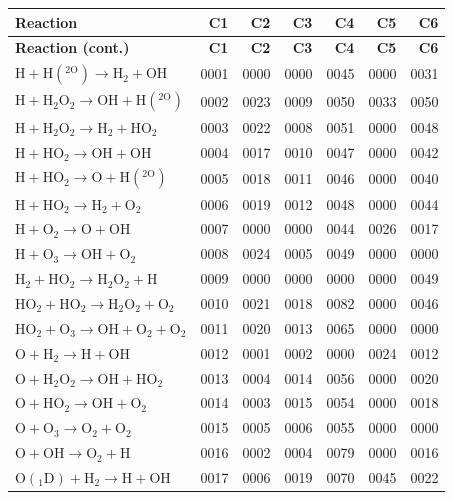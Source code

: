 \begin{longtable}{lrrrrrr}
\hline
\textbf{Reaction} & \textbf{C1} & \textbf{C2} & \textbf{C3} & \textbf{C4} & \textbf{C5} & \textbf{C6} \\
\hline
\endfirsthead
\hline
\textbf{Reaction (cont.)} & \textbf{C1} & \textbf{C2} & \textbf{C3} & \textbf{C4} & \textbf{C5} & \textbf{C6} \\
\hline
\endhead
\hline
\endfoot
$\mathrm{H + H(^{2O}) \rightarrow H_2 + OH}$ & 0001 & 0000 & 0000 & 0045 & 0000 & 0031 \\
$\mathrm{H + H_2O_2 \rightarrow OH + H(^{2O})}$ & 0002 & 0023 & 0009 & 0050 & 0033 & 0050 \\
$\mathrm{H + H_2O_2 \rightarrow H_2 + HO_2}$ & 0003 & 0022 & 0008 & 0051 & 0000 & 0048 \\
$\mathrm{H + HO_2 \rightarrow OH + OH}$ & 0004 & 0017 & 0010 & 0047 & 0000 & 0042 \\
$\mathrm{H + HO_2 \rightarrow O + H(^{2O})}$ & 0005 & 0018 & 0011 & 0046 & 0000 & 0040 \\
$\mathrm{H + HO_2 \rightarrow H_2 + O_2}$ & 0006 & 0019 & 0012 & 0048 & 0000 & 0044 \\
$\mathrm{H + O_2 \rightarrow O + OH}$ & 0007 & 0000 & 0000 & 0044 & 0026 & 0017 \\
$\mathrm{H + O_3 \rightarrow OH + O_2}$ & 0008 & 0024 & 0005 & 0049 & 0000 & 0000 \\
$\mathrm{H_2 + HO_2 \rightarrow H_2O_2 + H}$ & 0009 & 0000 & 0000 & 0000 & 0000 & 0049 \\
$\mathrm{HO_2 + HO_2 \rightarrow H_2O_2 + O_2}$ & 0010 & 0021 & 0018 & 0082 & 0000 & 0046 \\
$\mathrm{HO_2 + O_3 \rightarrow OH + O_2 + O_2}$ & 0011 & 0020 & 0013 & 0065 & 0000 & 0000 \\
$\mathrm{O + H_2 \rightarrow H + OH}$ & 0012 & 0001 & 0002 & 0000 & 0024 & 0012 \\
$\mathrm{O + H_2O_2 \rightarrow OH + HO_2}$ & 0013 & 0004 & 0014 & 0056 & 0000 & 0020 \\
$\mathrm{O + HO_2 \rightarrow OH + O_2}$ & 0014 & 0003 & 0015 & 0054 & 0000 & 0018 \\
$\mathrm{O + O_3 \rightarrow O_2 + O_2}$ & 0015 & 0005 & 0006 & 0055 & 0000 & 0000 \\
$\mathrm{O + OH \rightarrow O_2 + H}$ & 0016 & 0002 & 0004 & 0079 & 0000 & 0016 \\
$\mathrm{O(_1D) + H_2 \rightarrow H + OH}$ & 0017 & 0006 & 0019 & 0070 & 0045 & 0022 \\

\end{longtable}
